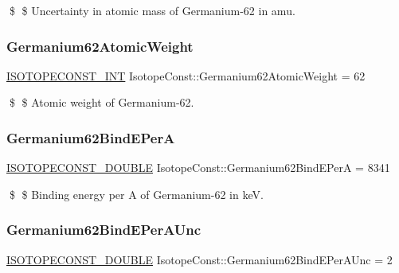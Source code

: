 \$ \$ Uncertainty in atomic mass of Germanium-\/62 in amu. \mbox{\label{group___isotope_const-_germanium-_ge62_ga27607ece0fd5d42c0b98a98db076e782}} 
\subsubsection{\texorpdfstring{Germanium62\+Atomic\+Weight}{Germanium62AtomicWeight}}
{\footnotesize\ttfamily \mbox{\hyperlink{group___isotope_const-_macros_ga5f18360b3e99483a35c32d789e62621c}{I\+S\+O\+T\+O\+P\+E\+C\+O\+N\+S\+T\+\_\+\+I\+NT}} Isotope\+Const\+::\+Germanium62\+Atomic\+Weight = 62}

\$ \$ Atomic weight of Germanium-\/62. \mbox{\label{group___isotope_const-_germanium-_ge62_ga9df2bf4f8395f8cc9e85caa030db09fb}} 
\subsubsection{\texorpdfstring{Germanium62\+Bind\+E\+PerA}{Germanium62BindEPerA}}
{\footnotesize\ttfamily \mbox{\hyperlink{group___isotope_const-_macros_ga8f45a7272ce02c0b4c65c44636ed719a}{I\+S\+O\+T\+O\+P\+E\+C\+O\+N\+S\+T\+\_\+\+D\+O\+U\+B\+LE}} Isotope\+Const\+::\+Germanium62\+Bind\+E\+PerA = 8341}

\$ \$ Binding energy per A of Germanium-\/62 in keV. \mbox{\label{group___isotope_const-_germanium-_ge62_gab375fcdee3d6d02df73a490602fe73a8}} 
\subsubsection{\texorpdfstring{Germanium62\+Bind\+E\+Per\+A\+Unc}{Germanium62BindEPerAUnc}}
{\footnotesize\ttfamily \mbox{\hyperlink{group___isotope_const-_macros_ga8f45a7272ce02c0b4c65c44636ed719a}{I\+S\+O\+T\+O\+P\+E\+C\+O\+N\+S\+T\+\_\+\+D\+O\+U\+B\+LE}} Isotope\+Const\+::\+Germanium62\+Bind\+E\+Per\+A\+Unc = 2}

